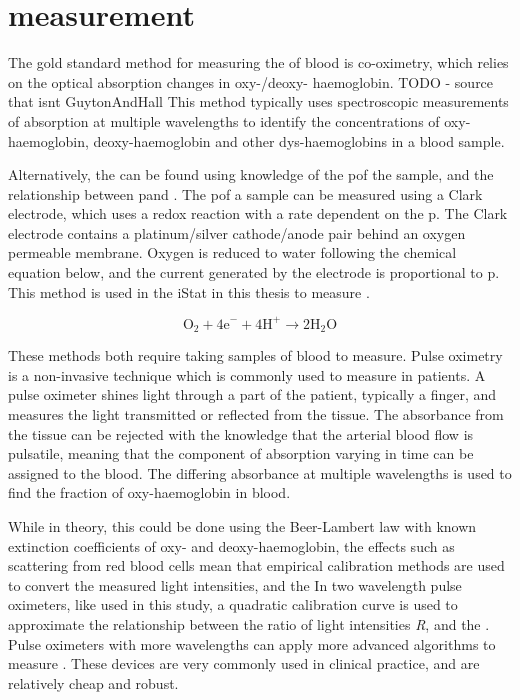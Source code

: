 \section{\SOtwo measurement}
\label{sec:back-pulseox}
The gold standard method for measuring the \SOtwo of blood is co-oximetry, which relies on the optical absorption changes in oxy-/deoxy- haemoglobin. TODO - source that isnt GuytonAndHall
This method typically uses spectroscopic measurements of absorption at multiple wavelengths to identify the concentrations of oxy-haemoglobin, deoxy-haemoglobin and other dys-haemoglobins in a blood sample.

Alternatively, the \SOtwo can be found using knowledge of the p\Otwo of the sample, and the relationship between p\Otwo and \SOtwo.
The p\Otwo of a sample can be measured using a Clark electrode, which uses a redox reaction with a rate dependent on the p\Otwo.
The Clark electrode contains a platinum/silver cathode/anode pair behind an oxygen permeable membrane.
Oxygen is reduced to water following the chemical equation below, and the current generated by the electrode is proportional to p\Otwo.
This method is used in the iStat in this thesis to measure \SOtwo.

\begin{equation}
\mathrm{O}_2 + \mathrm{4e}^- + \mathrm{4 H}^+ \rightarrow \mathrm{2H}_2\mathrm{O}
\label{eq:ClarkO2}
\end{equation}

These methods both require taking samples of blood to measure.
Pulse oximetry is a non-invasive technique which is commonly used to measure \SOtwo in patients.
A pulse oximeter shines light through a part of the patient, typically a finger, and measures the light transmitted or reflected from the tissue.
The absorbance from the tissue can be rejected with the knowledge that the arterial blood flow is pulsatile, meaning that the component of absorption varying in time can be assigned to the blood. \cite{WiebenLightAbsorbancePulse1997}
The differing absorbance at multiple wavelengths is used to find the fraction of oxy-haemoglobin in blood.

While in theory, this could be done using the Beer-Lambert law with known extinction coefficients of oxy- and deoxy-haemoglobin, the effects such as scattering from red blood cells mean that empirical calibration methods are used to convert the measured light intensities, and the \SOtwo \cite{WiebenLightAbsorbancePulse1997}
In two wavelength pulse oximeters, like used in this study, a quadratic calibration curve is used to approximate the relationship between the ratio of light intensities \textit{R}, and the \SOtwo.
Pulse oximeters with more wavelengths can apply more advanced algorithms to measure \SOtwo.
These devices are very commonly used in clinical practice, and are relatively cheap and robust.

